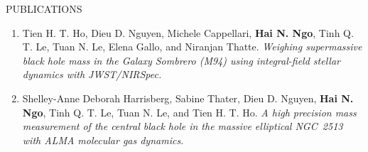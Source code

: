 \documentclass{resume} %
\begin{document}
\begin{rSection}{PUBLICATIONS}
\begin{enumerate}
\item Tien H. T. Ho,  {Dieu D. Nguyen}, Michele Cappellari, \textbf{Hai N. Ngo}, Tinh Q. T. Le, Tuan N. Le, Elena Gallo, and Niranjan Thatte.  \textit{Weighing supermassive black hole mass in the Galaxy Sombrero (M94) using integral-field stellar dynamics with JWST/NIRSpec.} %

\item Shelley-Anne Deborah Harrisberg, Sabine Thater, {Dieu D. Nguyen},\textbf{ Hai N. Ngo}, Tinh Q. T. Le, Tuan N. Le, and Tien H. T. Ho. \textit{A high precision mass measurement of the central black hole in the massive elliptical NGC~2513 with ALMA molecular gas dynamics.}  %
\end{enumerate}
\end{rSection} 
\end{document}
